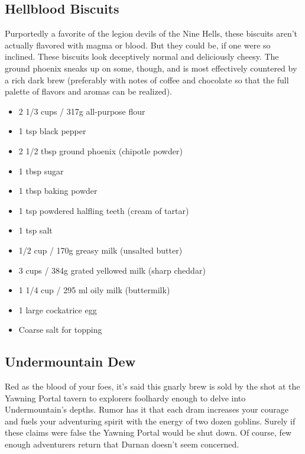 \documentclass[10pt,a4paper,twoside,twocolumn,openany,bg=print,nodeprecatedcode]{dndbook}
\begin{document}
\subsection{Hellblood Biscuits}
Purportedly a favorite of the legion devils of the Nine Hells, these biscuits aren't actually flavored with magma or blood. But they could be, if one were so inclined. These biscuits look deceptively normal and deliciously cheesy. The ground phoenix sneaks up on some, though, and is most effectively countered by a rich dark brew (preferably with notes of coffee and chocolate so that the full palette of flavors and aromas can be realized).

\begin{itemize}
\paragraph{Ingredients:}
\item 2 1/3 cups / 317g all-purpose flour
\item 1 tsp black pepper
\item 2 1/2 tbsp ground phoenix (chipotle powder)
\item 1 tbsp sugar
\item 1 tbsp baking powder
\item 1 tsp powdered halfling teeth (cream of tartar)
\item 1 tsp salt
\item 1/2 cup / 170g greasy milk (unsalted butter)
\item 3 cups / 384g grated yellowed milk (sharp cheddar)
\item 1 1/4 cup / 295 ml oily milk (buttermilk)
\item 1 large cockatrice egg
\item Coarse salt for topping
\end{itemize}

\subsection{Undermountain Dew}
Red as the blood of your foes, it's said this gnarly brew is sold by the shot at the Yawning Portal tavern to explorers foolhardy enough to delve into Undermountain's depths. Rumor has it that each dram increases your courage and fuels your adventuring spirit with the energy of two dozen goblins. Surely if these claims were false the Yawning Portal would be shut down. Of course, few enough adventurers return that Durnan doesn't seem concerned.
\end{document}
